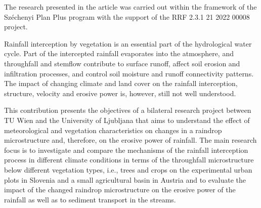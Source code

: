 The research presented in the article was carried out within the framework of the Széchenyi Plan Plus program with the support of the RRF 2.3.1 21 2022 00008 project. 




\newpage{}
{}
\begin{flushleft}







\end{flushleft}

\noindent

Rainfall interception by vegetation is an essential part of the hydrological water cycle. Part of the intercepted rainfall evaporates into the atmosphere, and throughfall and stemflow contribute to surface runoff, affect soil erosion and infiltration processes, and control soil moisture and runoff connectivity patterns. The impact of changing climate and land cover on the rainfall interception, structure, velocity and erosive power is, however, still not well understood. 

This contribution presents the objectives of a bilateral research project between TU Wien and the University of Ljubljana that aims to understand the effect of meteorological and vegetation characteristics on changes in a raindrop microstructure and, therefore, on the erosive power of rainfall. The main research focus is to investigate and compare the mechanisms of the rainfall interception process in different climate conditions in terms of the throughfall microstructure below different vegetation types, i.e., trees and crops on the experimental urban plots in Slovenia and a small agricultural basin in Austria and to evaluate the impact of the changed raindrop microstructure on the erosive power of the rainfall as well as to sediment transport in the streams. 

